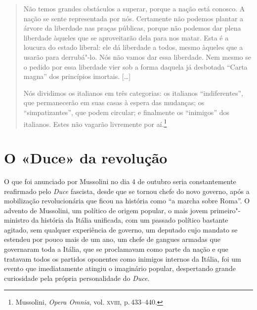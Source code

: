 \begin{quote}
Não temos grandes obstáculos a superar, porque a nação está conosco. A
nação se sente representada por nós. Certamente não podemos plantar a
árvore da liberdade nas praças públicas, porque não podemos dar plena
liberdade àqueles que se aproveitarão dela para nos matar. Esta é a
loucura do estado liberal: ele dá liberdade a todos, mesmo àqueles que a
usarão para derrubá"-lo. Nós não vamos dar essa liberdade. Nem mesmo se o
pedido por essa liberdade vier sob a forma daquela já desbotada ``Carta
magna'' dos princípios imortais. {[}\ldots{}{]}

Nós dividimos os italianos em três categorias: os italianos
``indiferentes'', que permanecerão em suas casas à espera das mudanças; os
``simpatizantes'', que podem circular; e finalmente os ``inimigos'' dos
italianos. Estes não vagarão livremente por aí.\footnote{Mussolini,
  \emph{Opera Omnia}, vol. \textsc{xviii}, p.\,433--440.}
\end{quote}

\section{O «Duce» da revolução}

O que foi anunciado por Mussolini no dia 4 de outubro seria
constantemente reafirmado pelo \emph{Duce} fascista, desde que se tornou
chefe do novo governo, após a mobilização revolucionária que ficou na
história como ``a marcha sobre Roma''. O advento de Mussolini, um político
de origem popular, o mais jovem primeiro"-ministro da história da Itália
unificada, com um passado político bastante agitado, sem qualquer
experiência de governo, um deputado cujo mandato se estendeu por pouco
mais de um ano, um chefe de gangues armadas que governaram toda a
Itália, que se proclamavam como parte da nação e que tratavam todos os
partidos oponentes como inimigos internos da Itália, foi um evento que
imediatamente atingiu o imaginário popular, despertando grande
curiosidade pela própria personalidade do \emph{Duce}.

